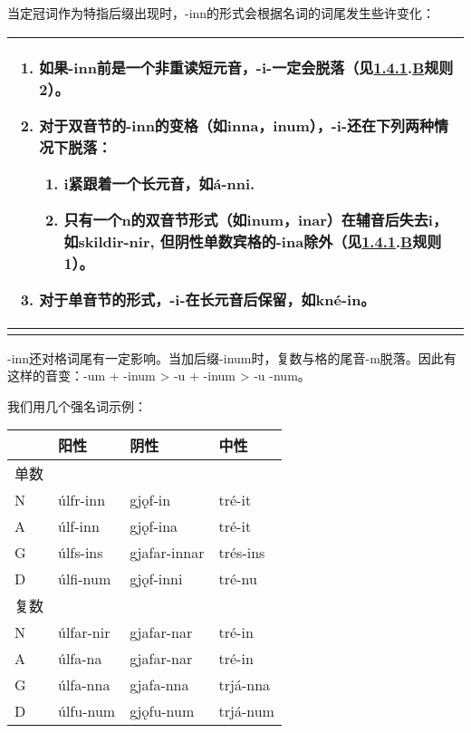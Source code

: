 当定冠词作为特指后缀出现时，-inn的形式会根据名词的词尾发生些许变化：

\begin{longtable}{l}
\toprule
\begin{enumerate}\def\labelenumi{\arabic{enumi})}\item  如果-inn前是一个非重读短元音，-i-一定会脱落（见\hyperref[ux5143ux97f3ux7684ux97f3ux53d8]{1.4.1}.\hyperref[_Ref115693879]{B}规则2）。\item  对于双音节的-inn的变格（如inna，inum），-i-还在下列两种情况下脱落：  \begin{enumerate}  \def\labelenumii{\roman{enumii}.}  \item    i紧跟着一个长元音，如á-nni.  \item    只有一个n的双音节形式（如inum，inar）在辅音后失去i，如skildir-nir,    但阴性单数宾格的-ina除外（见\hyperref[ux5143ux97f3ux7684ux97f3ux53d8]{1.4.1}.\hyperref[_Ref115693879]{B}规则1）。  \end{enumerate}\item  对于单音节的形式，-i-在长元音后保留，如kné-in。\end{enumerate} \\
\midrule
\endhead
\bottomrule
\endfoot
\end{longtable}

-inn还对格词尾有一定影响。当加后缀-inum时，复数与格的尾音-m脱落。因此有这样的音变：-um
+ -inum \textgreater{} -u + -inum \textgreater{} -u -num。

我们用几个强名词示例：

\begin{longtable}{llll}
\toprule
 & 阳性 & 阴性 & 中性 \\
\midrule
\endhead
\bottomrule
\endfoot
单数 & & & \\
N & úlfr-inn & gjǫf-in & tré-it \\
A & úlf-inn & gjǫf-ina & tré-it \\
G & úlfs-ins & gjafar-innar & trés-ins \\
D & úlfi-num & gjǫf-inni & tré-nu \\
复数 & & & \\
N & úlfar-nir & gjafar-nar & tré-in \\
A & úlfa-na & gjafar-nar & tré-in \\
G & úlfa-nna & gjafa-nna & trjá-nna \\
D & úlfu-num & gjǫfu-num & trjá-num \\
\end{longtable}

